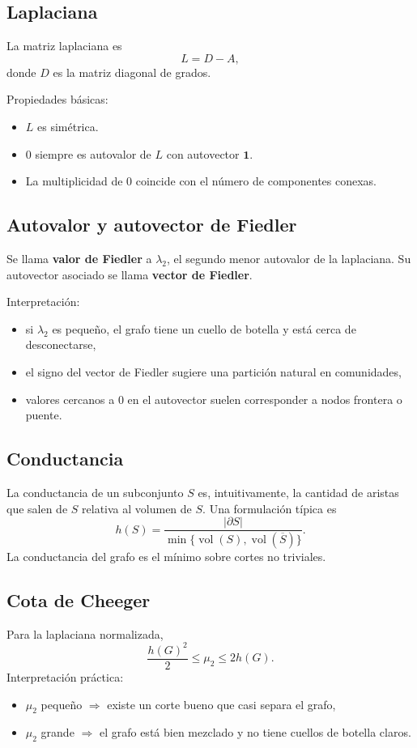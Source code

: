 \documentclass[11pt,a4paper]{article}
\begin{document}
\subsection{Laplaciana}
La matriz laplaciana es
\[
L=D-A,
\]
donde $D$ es la matriz diagonal de grados.

Propiedades básicas:
\begin{itemize}
    \item $L$ es simétrica.
    \item $0$ siempre es autovalor de $L$ con autovector $\mathbf{1}$.
    \item La multiplicidad de $0$ coincide con el número de componentes conexas.
\end{itemize}

\subsection{Autovalor y autovector de Fiedler}
Se llama \textbf{valor de Fiedler} a $\lambda_2$, el segundo menor autovalor de la laplaciana. Su autovector asociado se llama \textbf{vector de Fiedler}.

Interpretación:
\begin{itemize}
    \item si $\lambda_2$ es pequeño, el grafo tiene un cuello de botella y está cerca de desconectarse,
    \item el signo del vector de Fiedler sugiere una partición natural en comunidades,
    \item valores cercanos a $0$ en el autovector suelen corresponder a nodos frontera o puente.
\end{itemize}

\subsection{Conductancia}
La conductancia de un subconjunto $S$ es, intuitivamente, la cantidad de aristas que salen de $S$ relativa al volumen de $S$. Una formulación típica es
\[
h(S)=\frac{|\partial S|}{\min\{\operatorname{vol}(S),\operatorname{vol}(\overline{S})\}}.
\]
La conductancia del grafo es el mínimo sobre cortes no triviales.

\subsection{Cota de Cheeger}
Para la laplaciana normalizada,
\[
\frac{h(G)^2}{2}\le \mu_2\le 2h(G).
\]
Interpretación práctica:
\begin{itemize}
    \item $\mu_2$ pequeño $\Rightarrow$ existe un corte bueno que casi separa el grafo,
    \item $\mu_2$ grande $\Rightarrow$ el grafo está bien mezclado y no tiene cuellos de botella claros.
\end{itemize}
\end{document}
